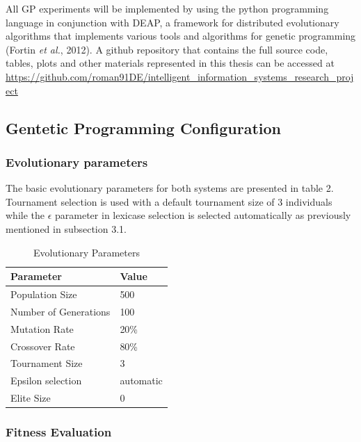 \documentclass[
  12pt,
]{article}
\begin{document}
All GP experiments will be implemented by using the python programming
language in conjunction with DEAP, a framework for distributed
evolutionary algorithms that implements various tools and algorithms for
genetic programming (Fortin \emph{et al.}, 2012). A github repository
that contains the full source code, tables, plots and other materials
represented in this thesis can be accessed at
\protect\hyperlink{https:ux2fux2fgithub.comux2froman91DEux2fintelligent_information_systems_research_project}{https://github.com/roman91DE/intelligent\_information\_systems\_research\_project}

\hypertarget{gentetic-programming-configuration}{%
\subsection{Gentetic Programming
Configuration}\label{gentetic-programming-configuration}}

\hypertarget{evolutionary-parameters}{%
\subsubsection{Evolutionary parameters}\label{evolutionary-parameters}}

The basic evolutionary parameters for both systems are presented in
table 2. Tournament selection is used with a default tournament size of
\(3\) individuals while the \(\epsilon\) parameter in lexicase selection
is selected automatically as previously mentioned in subsection 3.1.

\begin{table}[!h]

\caption{\label{tab:unnamed-chunk-2}Evolutionary Parameters}
\centering
\begin{tabular}[t]{l|l}
\hline
\textbf{Parameter} & \textbf{Value}\\
\hline
Population Size & 500\\
\hline
Number of Generations & 100\\
\hline
Mutation Rate & 20\%\\
\hline
Crossover Rate & 80\%\\
\hline
Tournament Size & 3\\
\hline
Epsilon selection & automatic\\
\hline
Elite Size & 0\\
\hline
\end{tabular}
\end{table}

\hypertarget{fitness-evaluation}{%
\subsubsection{Fitness Evaluation}\label{fitness-evaluation}}
\end{document}
